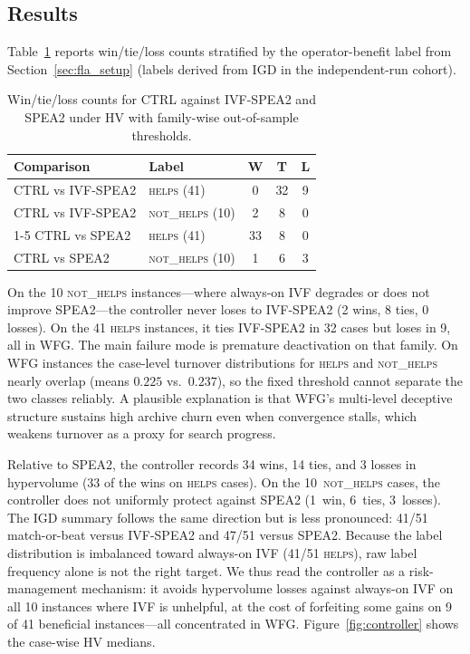 \documentclass[runningheads]{llncs}
\begin{document}
\subsection{Results}
\label{sec:ctrl_results}

Table~\ref{tab:ctrl_wtl} reports win/tie/loss counts stratified by the
operator-benefit label from Section~\ref{sec:fla_setup} (labels derived from
IGD in the independent-run cohort).

\begin{table}[t]
	\centering
	\caption{Win/tie/loss counts for CTRL against IVF-SPEA2 and SPEA2 under HV
		with family-wise out-of-sample thresholds.}
	\label{tab:ctrl_wtl}
	\begin{tabular}{llccc}
		\toprule
		\textbf{Comparison} & \textbf{Label}           & \textbf{W} & \textbf{T} & \textbf{L} \\
		\midrule
		CTRL vs IVF-SPEA2   & \textsc{helps} (41)      & 0          & 32         & 9          \\
		CTRL vs IVF-SPEA2   & \textsc{not\_helps} (10) & 2          & 8          & 0          \\
		\cmidrule(lr){1-5}
		CTRL vs SPEA2       & \textsc{helps} (41)      & 33         & 8          & 0          \\
		CTRL vs SPEA2       & \textsc{not\_helps} (10) & 1          & 6          & 3          \\
		\bottomrule
	\end{tabular}
\end{table}

On the 10 \textsc{not\_helps} instances---where always-on IVF degrades or does
not improve SPEA2---the controller never loses to IVF-SPEA2 (2 wins, 8 ties,
0 losses). On the 41 \textsc{helps} instances, it ties IVF-SPEA2 in 32 cases
but loses in 9, all in WFG. The main failure mode is premature
deactivation on that family. On WFG instances the case-level turnover
distributions for \textsc{helps} and \textsc{not\_helps} nearly overlap
(means $0.225$ vs.\ $0.237$), so the fixed threshold cannot separate the
two classes reliably. A plausible explanation is that WFG's multi-level
deceptive structure sustains high archive churn even when convergence stalls,
which weakens turnover as a proxy for search progress.

Relative to SPEA2, the controller records 34 wins, 14 ties, and 3 losses
in hypervolume (33 of the wins on \textsc{helps} cases). On the
10~\textsc{not\_helps} cases, the controller does not uniformly protect
against SPEA2 (1~win, 6~ties, 3~losses). The IGD summary follows the same
direction but is less pronounced: 41/51 match-or-beat versus IVF-SPEA2 and
47/51 versus SPEA2. Because the label distribution is imbalanced toward
always-on IVF (41/51 \textsc{helps}), raw label frequency alone is not the
right target. We thus read the controller as a risk-management mechanism:
it avoids hypervolume losses against always-on IVF on all 10 instances where
IVF is unhelpful, at the cost of forfeiting some gains on 9 of 41 beneficial
instances---all concentrated in WFG.
Figure~\ref{fig:controller} shows the case-wise HV medians.
\end{document}
